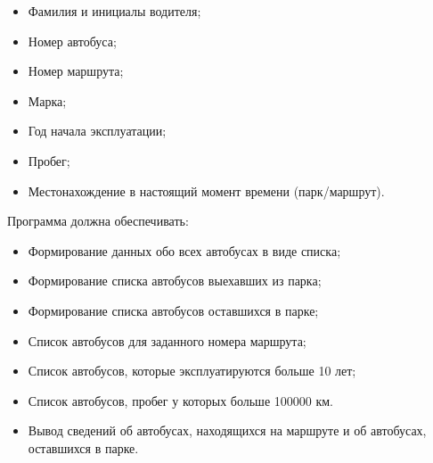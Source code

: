 \begin{itemize}
    \item Фамилия и инициалы водителя;
    \item Номер автобуса;
    \item Номер маршрута;
    \item Марка;
    \item Год начала эксплуатации;
    \item Пробег;
    \item Местонахождение в настоящий момент времени (парк/маршрут).
\end{itemize}
Программа должна обеспечивать:
\begin{itemize}
    \item Формирование данных обо всех автобусах в виде списка;
    \item Формирование списка автобусов выехавших из парка;
    \item Формирование списка автобусов оставшихся в парке;
    \item Список автобусов для заданного номера маршрута;
    \item Список автобусов, которые эксплуатируются больше 10 лет;
    \item Список автобусов, пробег у которых больше 100000 км.
    \item Вывод сведений об автобусах, находящихся на маршруте и об автобусах, оставшихся в
          парке.
\end{itemize}

\newcommand{\basefile}{../../src/ssp_po5/reports/Karnasevich/3/src/main3/}



